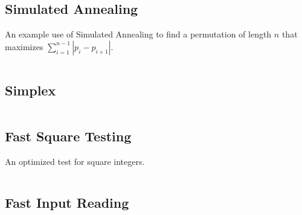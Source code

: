 \documentclass[8pt,a4paper,landscape,oneside]{amsart}
\newcommand{\code}[1]{\inputminted[fontsize=\normalsize,baselinestretch=1]{cpp}{_code/#1}}
\newif\ifverbose
\begin{document}
\begin{multicols*}{3}
    \subsection{Simulated Annealing}
        An example use of Simulated Annealing to find a permutation of length $n$
        that maximizes $\sum_{i=1}^{n-1}|p_i - p_{i+1}|$.
        \code{other/simulated_annealing.cpp}

    \subsection{Simplex}
        \code{other/simplex.cpp}

    \subsection{Fast Square Testing}
        An optimized test for square integers.
        \code{tricks/is_square.cpp}

    \subsection{Fast Input Reading}
        \ifverbose
        If input or output is huge, sometimes it is beneficial to optimize the
        input reading/output writing. This can be achieved by reading all input
        in at once (using fread), and then parsing it manually. Output can also
        be stored in an output buffer and then dumped once in the end (using
        fwrite). A simpler, but still effective, way to achieve speed is to use
        the following input reading method.
        \fi
        \code{tricks/fast_input.cpp}

    \ifverbose
    \subsection{128-bit Integer}
        GCC has a 128-bit integer data type named \texttt{\_\_int128}. Useful
        if doing multiplication of 64-bit integers, or something needing a
        little more than 64-bits to represent. There's also
        \texttt{\_\_float128}.
    \fi


\end{multicols*}
\end{document}
